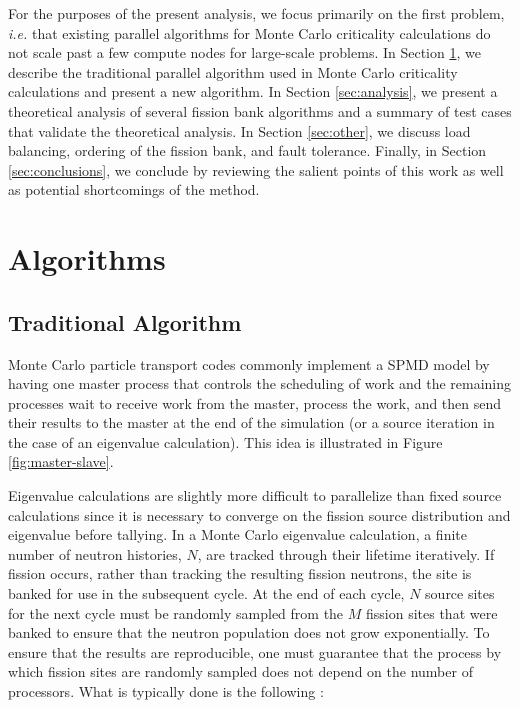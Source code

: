 \documentclass[11pt]{article}
\begin{document}
For the purposes of the present analysis, we focus primarily on the
first problem, {\em i.e.} that existing parallel algorithms for Monte
Carlo criticality calculations do not scale past a few compute nodes
for large-scale problems. In Section \ref{sec:algorithms}, we describe
the traditional parallel algorithm used in Monte Carlo criticality
calculations and present a new algorithm. In Section
\ref{sec:analysis}, we present a theoretical analysis of several
fission bank algorithms and a summary of test cases that validate the
theoretical analysis. In Section \ref{sec:other}, we discuss load
balancing, ordering of the fission bank, and fault tolerance. Finally,
in Section \ref{sec:conclusions}, we conclude by reviewing the salient
points of this work as well as potential shortcomings of the method.

\section{Algorithms}
\label{sec:algorithms}

\subsection{Traditional Algorithm}

Monte Carlo particle transport codes commonly implement a SPMD model
by having one master process that controls the scheduling of work and
the remaining processes wait to receive work from the master, process
the work, and then send their results to the master at the end of the
simulation (or a source iteration in the case of an eigenvalue
calculation). This idea is illustrated in Figure
\ref{fig:master-slave}.

Eigenvalue calculations are slightly more difficult to parallelize
than fixed source calculations since it is necessary to converge on
the fission source distribution and eigenvalue before tallying. In a
Monte Carlo eigenvalue calculation, a finite number of neutron
histories, $N$, are tracked through their lifetime iteratively. If
fission occurs, rather than tracking the resulting fission neutrons,
the site is banked for use in the subsequent cycle. At the end of each
cycle, $N$ source sites for the next cycle must be randomly sampled
from the $M$ fission sites that were banked to ensure that the neutron
population does not grow exponentially. To ensure that the results are
reproducible, one must guarantee that the process by which fission
sites are randomly sampled does not depend on the number of
processors. What is typically done is the following \cite{mcnp}:
\end{document}
